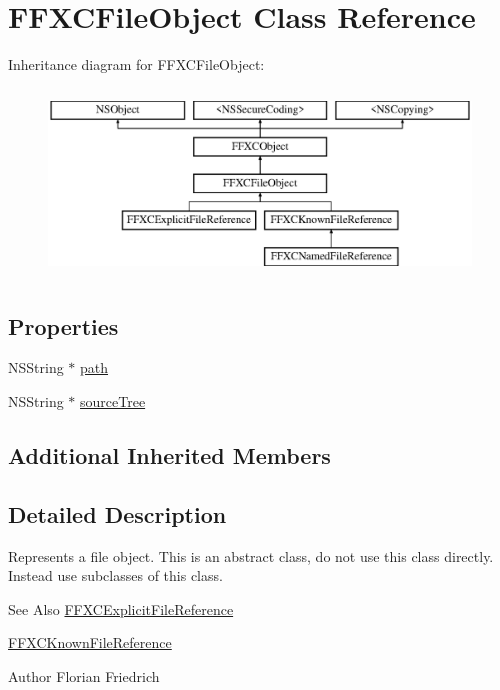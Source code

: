 \hypertarget{interface_f_f_x_c_file_object}{\section{F\-F\-X\-C\-File\-Object Class Reference}
\label{interface_f_f_x_c_file_object}
}
Inheritance diagram for F\-F\-X\-C\-File\-Object\-:\begin{figure}[H]
\begin{center}
\leavevmode
\includegraphics[height=5.000000cm]{interface_f_f_x_c_file_object}
\end{center}
\end{figure}
\subsection*{Properties}
\begin{DoxyCompactItemize}
\item 
N\-S\-String $\ast$ \hyperlink{interface_f_f_x_c_file_object_a5552179bb57b10de7dfd8b47e47a76d1}{path}
\item 
N\-S\-String $\ast$ \hyperlink{interface_f_f_x_c_file_object_a7e2268306d098ba91483be6df120fc5a}{source\-Tree}
\end{DoxyCompactItemize}
\subsection*{Additional Inherited Members}


\subsection{Detailed Description}
Represents a file object. This is an abstract class, do not use this class directly. Instead use subclasses of this class. \begin{DoxySeeAlso}{See Also}
\hyperlink{interface_f_f_x_c_explicit_file_reference}{F\-F\-X\-C\-Explicit\-File\-Reference} 

\hyperlink{interface_f_f_x_c_known_file_reference}{F\-F\-X\-C\-Known\-File\-Reference} 
\end{DoxySeeAlso}
\begin{DoxyAuthor}{Author}
Florian Friedrich 
\end{DoxyAuthor}


